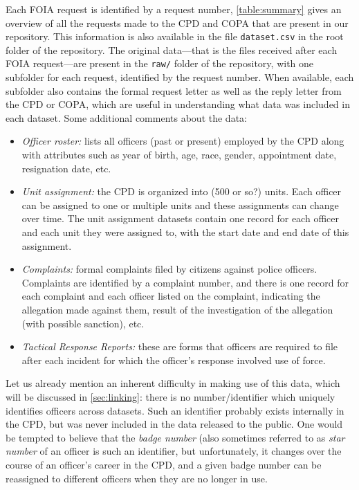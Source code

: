 \documentclass{article}
\begin{document}
Each FOIA request is identified by a request number, \cref{table:summary} gives
an overview of all the requests made to the CPD and COPA that are present in
our repository. This information is also available in the file
\texttt{dataset.csv} in the root folder of the repository. The original
data—that is the files received after each FOIA request—are present in the
\texttt{raw/} folder of the repository, with one subfolder for each request,
identified by the request number. When available, each subfolder also contains
the formal request letter as well as the reply letter from the CPD or COPA,
which are useful in understanding what data was included in each dataset.
Some additional comments about the data:
\begin{itemize}
	\item \emph{Officer roster:} lists all officers (past or present) employed
		by the CPD along with attributes such as year of birth, age, race,
		gender, appointment date, resignation date, etc.
	\item \emph{Unit assignment:} the CPD is organized into (500 or so?) units.
		Each officer can be assigned to one or multiple units and these
		assignments can change over time. The unit assignment datasets contain
		one record for each officer and each unit they were assigned to, with
		the start date and end date of this assignment.
	\item \emph{Complaints:} formal complaints filed by citizens against police
		officers. Complaints are identified by a complaint number, and there is
		one record for each complaint and each officer listed on the complaint,
		indicating the allegation made against them, result of the
		investigation of the allegation (with possible sanction), etc.
	\item \emph{Tactical Response Reports:} these are forms that officers are
		required to file after each incident for which the officer's response
		involved use of force.
\end{itemize}

Let us already mention an inherent difficulty in making use of this data, which
will be discussed in \cref{sec:linking}: there is no number/identifier which
uniquely identifies officers across datasets. Such an identifier probably
exists internally in the CPD, but was never included in the data released to
the public. One would be tempted to believe that the \emph{badge number} (also
sometimes referred to as \emph{star number} of an officer is such an
identifier, but unfortunately, it changes over the course of an officer's
career in the CPD, and a given badge number can be reassigned to different
officers when they are no longer in use.
\end{document}
